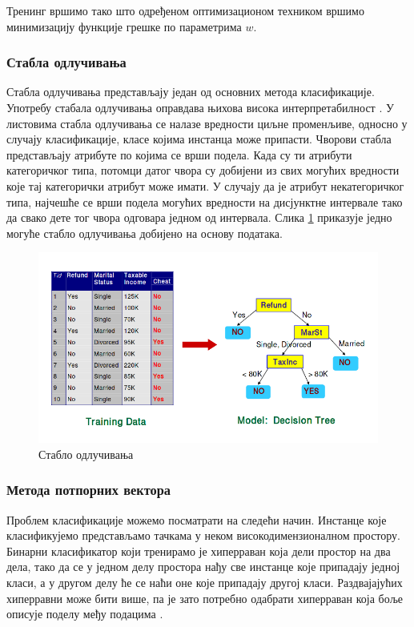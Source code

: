 \documentclass[a4paper]{article}
\begin{document}
{Тренинг вршимо тако што одређеном оптимизационом техником вршимо минимизацију функције грешке по параметрима $w$.


\subsubsection*{Стабла одлучивања}
Стабла одлучивања представљају један од основних метода класификације. Употребу стабала одлучивања оправдава њихова висока интерпретабилност \cite{dct-survey}. У листовима стабла одлучивања се налазе вредности циљне променљиве, односно у случају класификације, класе којима инстанца може припасти. Чворови стабла представљају атрибуте по којима се врши подела. Када су ти атрибути категоричког типа, потомци датог чвора су добијени из свих могућих вредности које тај категорички атрибут може имати. У случају да је атрибут некатегоричког типа, најчешће се врши подела могућих вредности на дисјунктне интервале тако да свако дете тог чвора одговара једном од интервала. Слика \ref{fig:stablo} приказује једно могуће стабло одлучивања добијено на основу података.

\begin{figure}[h!]
\begin{center}
\includegraphics[scale=0.4]{decision_tree.png}
\end{center}
\caption{Стабло одлучивања}
\label{fig:stablo}
\end{figure}


\subsubsection*{Метода потпорних вектора}
Проблем класификације можемо посматрати на следећи начин. Инстанце које класификујемо представљамо тачкама у неком високодимензионалном простору. Бинарни класификатор који тренирамо је хиперраван која дели простор на два дела, тако да се у једном делу простора нађу све инстанце које припадају једној класи, а у другом делу ће се наћи оне које припадају другој класи. Раздвајајућих хиперравни може бити више, па је зато потребно одабрати хиперраван која боље описује поделу међу подацима \cite{svm-intro}.


}
\end{document}
